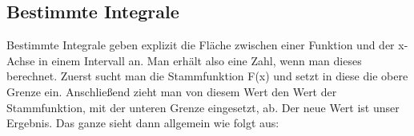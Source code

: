 \subsection{Bestimmte Integrale}
	Bestimmte Integrale geben explizit die Fläche zwischen einer Funktion und der
	x-Achse in einem Intervall an. Man erhält also eine Zahl, wenn man dieses
	berechnet. Zuerst sucht man die Stammfunktion F(x) und setzt in diese die obere
	Grenze ein. Anschließend zieht man von diesem Wert den Wert der Stammfunktion,
	mit der unteren Grenze eingesetzt, ab. Der neue Wert ist unser Ergebnis. Das
	ganze sieht dann allgemein wie folgt aus:
	\formel{\[\int\limits_a^b f(x) \ dx=F(b)-F(a)\]}
	
